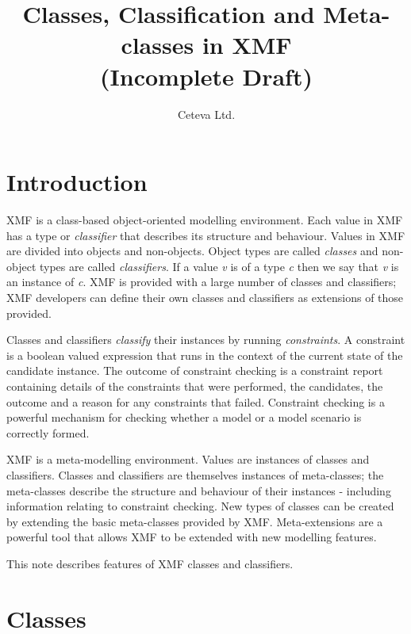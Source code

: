 \documentclass{article}
\title{Classes, Classification and Meta-classes in XMF\\(Incomplete Draft)}
\author{Ceteva Ltd.}
\begin{document}
\maketitle

\section{Introduction}

XMF is a class-based object-oriented modelling environment. Each value in XMF has a type or {\em classifier}
that describes its structure and behaviour. Values in XMF are divided into objects and non-objects. Object
types are called {\em classes} and non-object types are called {\em classifiers}. If a value {\em v} is of a 
type {\em c} then we say that {\em v} is an instance of {\em c}. XMF is provided with a large number of classes 
and classifiers; XMF developers can define their own classes and classifiers as extensions of those provided.

Classes and classifiers {\em classify} their instances by running {\em constraints}. A constraint is a
boolean valued expression that runs in the context of the current state of the candidate instance. The
outcome of constraint checking is a constraint report containing details of the constraints that were
performed, the candidates, the outcome and a reason for any constraints that failed. Constraint checking is
a powerful mechanism for checking whether a model or a model scenario is correctly formed.

XMF is a meta-modelling environment. Values are instances of classes and classifiers. Classes and classifiers 
are themselves instances of meta-classes; the meta-classes describe the structure and behaviour of their
instances - including information relating to constraint checking. New types of classes can be created by
extending the basic meta-classes provided by XMF. Meta-extensions are a powerful tool that allows XMF to be
extended with new modelling features.

This note describes features of XMF classes and classifiers. 

\section{Classes}
\end{document}
